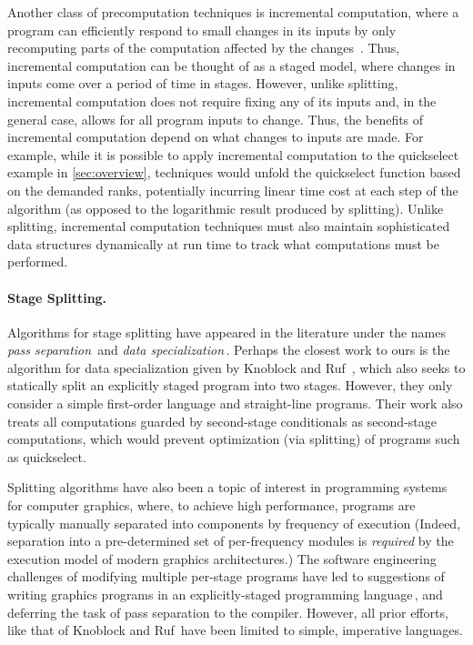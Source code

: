 Another class of precomputation techniques is incremental computation,
where a program can efficiently respond to small changes in its inputs
by only recomputing parts of the computation affected by the
changes~\cite{DemersReTe81,PughTe89,RamalingamRe93,AcarBlBlHaTa09}.
Thus, incremental computation can be thought of as a staged model,
where changes in inputs come over a period of time in stages.
However, unlike splitting, incremental computation does not require
fixing any of its inputs and, in the general case, allows for all
program inputs to change. Thus, the benefits of incremental
computation depend on what changes to inputs are made. For example,
while it is possible to apply incremental computation to the
quickselect example in \ref{sec:overview}, techniques would unfold the
quickselect function based on the demanded ranks, potentially
incurring linear time cost at each step of the algorithm (as opposed
to the logarithmic result produced by splitting).  Unlike splitting,
incremental computation techniques must also maintain sophisticated
data structures dynamically at run time to track what computations
must be performed.

\paragraph{Stage Splitting.}

Algorithms for stage splitting have appeared in the literature under the names 
{\em pass separation}\,\cite{JS86-staging} and {\em data specialization}\,\cite{knoblock96}.
Perhaps the closest work to ours is the algorithm for data
specialization given by Knoblock and Ruf~\cite{knoblock96}, which
also seeks to statically split an explicitly staged program into two
stages.  However, they only consider a simple first-order language and
straight-line programs. Their work also treats all computations
guarded by second-stage conditionals as second-stage computations,
which would prevent optimization (via splitting) of programs such as
quickselect.

Splitting algorithms have also been a topic of interest in
programming systems for computer graphics, where, to achieve
high performance, programs are typically manually separated into
components by frequency of execution (Indeed, separation into a pre-determined
set of per-frequency modules is \emph{required} by the execution model
of modern graphics architectures.)  The software engineering
challenges of modifying multiple per-stage programs have led to
suggestions of writing graphics programs in an explicitly-staged
programming language\,\cite{Proudfoot:2001,Foley:2011,He:2014}, and
deferring the task of pass separation to the compiler. However, all
prior efforts, like that of Knoblock and Ruf\,\cite{knoblock96} have
been limited to simple, imperative languages. 


